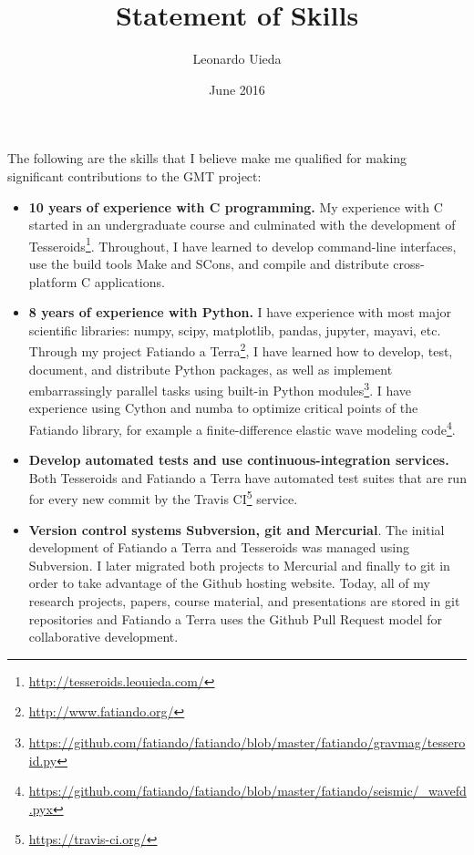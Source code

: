 \documentclass[12pt]{article}
\title{\textbf{Statement of Skills}}
\author{Leonardo Uieda}
\date{June 2016}
\begin{document}
\maketitle


The following are
the skills that
I believe make me qualified
for making significant contributions
to the GMT project:
%

\begin{itemize}
    \item \textbf{10 years of experience with C programming.}
        My experience with C started in an undergraduate course
        and culminated with the development of
        Tesseroids\footnote{\url{http://tesseroids.leouieda.com/}}.
        Throughout, I have learned to develop command-line interfaces,
        use the build tools Make and SCons,
        and compile and distribute cross-platform C applications.

    \item \textbf{8 years of experience with Python.}
        I have experience with most major scientific libraries:
        numpy, scipy, matplotlib, pandas, jupyter, mayavi, etc.
        Through my project Fatiando a
        Terra\footnote{\url{http://www.fatiando.org/}},
        I have learned how to develop,
        test, document, and distribute Python packages,
        as well as implement embarrassingly parallel tasks
        using built-in Python
        modules\footnote{\url{https://github.com/fatiando/fatiando/blob/master/fatiando/gravmag/tesseroid.py}}.
        I have experience using Cython and numba to optimize critical points
        of the Fatiando library, for example a finite-difference elastic wave
        modeling
        code\footnote{\url{https://github.com/fatiando/fatiando/blob/master/fatiando/seismic/_wavefd.pyx}}.

    \item \textbf{Develop automated tests and use continuous-integration
        services.}
        Both Tesseroids and Fatiando a Terra have automated test suites
        that are run for every new commit by the Travis
        CI\footnote{\url{https://travis-ci.org/}} service.

    \item \textbf{Version control systems Subversion, git and
        Mercurial}.
        The initial development of Fatiando a Terra and Tesseroids was managed
        using Subversion. I later migrated both projects to Mercurial and
        finally to git in order to take advantage of the Github hosting
        website. Today, all of my research projects, papers, course material,
        and presentations are stored in git repositories and Fatiando a Terra
        uses the Github Pull Request model for collaborative development.


\end{itemize}
\end{document}
